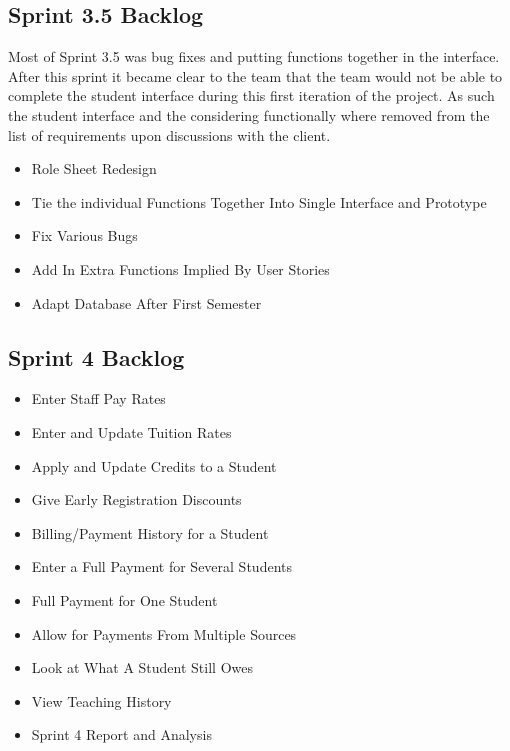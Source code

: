 \subsection{Sprint 3.5 Backlog}
Most of Sprint 3.5 was bug fixes and putting functions together in the interface. After this sprint it became clear to the team that the team would not be able to complete the student interface during this first iteration of the project. As such the student interface and the considering functionally where removed from the list of requirements upon discussions with the client.

\begin{itemize}
\item Role Sheet Redesign 
\item Tie the individual Functions Together Into Single Interface and Prototype 
\item Fix Various Bugs
\item Add In Extra Functions Implied By User Stories
\item Adapt Database After First Semester 
\end{itemize}

\subsection{Sprint 4 Backlog}
\begin{itemize}
\item Enter Staff Pay Rates
\item Enter and Update Tuition Rates
\item Apply and Update Credits to a Student
\item Give Early Registration Discounts
\item Billing/Payment History for a Student
\item Enter a Full Payment for Several Students
\item Full Payment for One Student
\item Allow for Payments From Multiple Sources 
\item Look at What A Student Still Owes
\item View Teaching History
\item Sprint 4 Report and Analysis 
\end{itemize}

